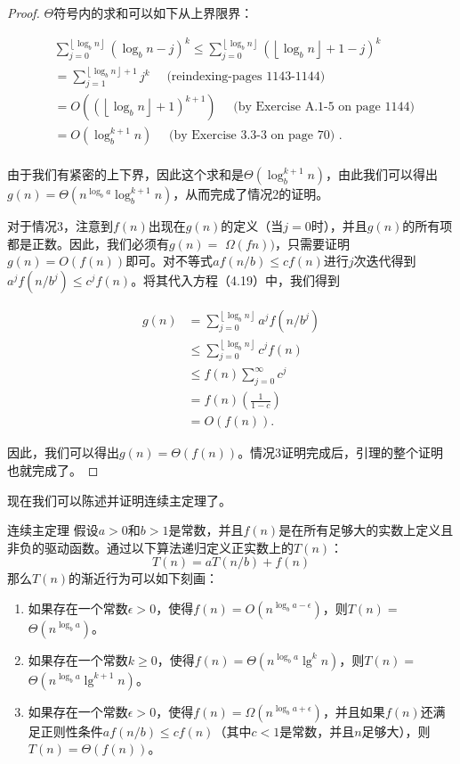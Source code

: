 \documentclass[lang=cn,newtx,10pt,scheme=chinese]{elegantbook}
\begin{document}
\begin{proof}
$\Theta$符号内的求和可以如下从上界限界：

$$
\begin{aligned}
& \sum_{j=0}^{\left\lfloor\log _b n\right\rfloor}\left(\log _b n-j\right)^k \leq \sum_{j=0}^{\left\lfloor\log _b n\right\rfloor}\left(\left\lfloor\log _b n\right\rfloor+1-j\right)^k \\
& =\sum_{j=1}^{\left\lfloor\log _b n\right\rfloor+1} j^k \quad \text { (reindexing-pages 1143-1144) } \\
& =O\left(\left(\left\lfloor\log _b n\right\rfloor+1\right)^{k+1}\right) \quad \text { (by Exercise A.1-5 on page 1144) } \\
& =O\left(\log _b^{k+1} n\right) \quad \text { (by Exercise 3.3-3 on page 70) . } \\
&
\end{aligned}
$$

由于我们有紧密的上下界，因此这个求和是$\Theta\left(\log _b^{k+1} n\right)$，由此我们可以得出$g(n)=\Theta\left(n^{\log _b a} \log _b^{k+1} n\right)$，从而完成了情况2的证明。

对于情况3，注意到$f(n)$出现在$g(n)$的定义（当$j=0$时），并且$g(n)$的所有项都是正数。因此，我们必须有$g(n)=$ $\Omega(f n))$，只需要证明$g(n)=O(f(n))$即可。对不等式$a f(n / b) \leq c f(n)$进行$j$次迭代得到$a^j f\left(n / b^j\right) \leq c^j f(n)$。将其代入方程（4.19）中，我们得到

$$
\begin{aligned}
g(n) & =\sum_{j=0}^{\left\lfloor\log _b n\right\rfloor} a^j f\left(n / b^j\right) \\
& \leq \sum_{j=0}^{\left\lfloor\log _b n\right\rfloor} c^j f(n) \\
& \leq f(n) \sum_{j=0}^{\infty} c^j \\
& =f(n)\left(\frac{1}{1-c}\right) \\
& =O(f(n)) .
\end{aligned}
$$

因此，我们可以得出$g(n)=\Theta(f(n))$。情况3证明完成后，引理的整个证明也就完成了。
\end{proof}

现在我们可以陈述并证明连续主定理了。

\begin{theorem}{连续主定理}{}
假设$a>0$和$b>1$是常数，并且$f(n)$是在所有足够大的实数上定义且非负的驱动函数。通过以下算法递归定义正实数上的$T(n)$：
$$
T(n)=a T(n / b)+f(n)
$$
那么$T(n)$的渐近行为可以如下刻画：
\begin{enumerate}
\item 如果存在一个常数$\epsilon>0$，使得$f(n)=O\left(n^{\log _b a-\epsilon}\right)$，则$T(n)=$ $\Theta\left(n^{\log _b a}\right)$。
\item 如果存在一个常数$k \geq 0$，使得$f(n)=\Theta\left(n^{\log _b a} \lg ^k n\right)$，则$T(n)=$ $\Theta\left(n^{\log _b a} \lg ^{k+1} n\right)$。
\item 如果存在一个常数$\epsilon>0$，使得$f(n)=\Omega\left(n^{\log _b a+\epsilon}\right)$，并且如果$f(n)$还满足正则性条件$a f(n / b) \leq c f(n)$（其中$c<1$是常数，并且$n$足够大），则$T(n)=\Theta(f(n))$。
\end{enumerate}
\end{theorem}
\end{document}
